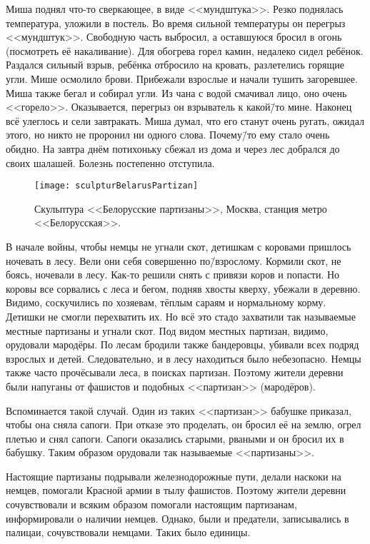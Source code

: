 Миша поднял что-то сверкающее, в виде <<мундштука>>. Резко поднялась температура, уложили в постель. Во время сильной температуры он перегрыз <<мундштук>>. Свободную часть выбросил, а оставшуюся бросил в огонь (посмотреть её накаливание). Для обогрева горел камин, недалеко сидел ребёнок. Раздался сильный взрыв, ребёнка отбросило на кровать, разлетелись горящие угли. Мише осмолило брови. Прибежали взрослые и начали тушить загоревшее. Миша также бегал и собирал угли. Из чана с водой смачивал лицо, оно очень <<горело>>. Оказывается, перегрыз он взрыватель к какой\=/то мине. Наконец всё улеглось и сели завтракать. Миша думал, что его станут очень ругать, ожидал этого, но никто не проронил ни одного слова. Почему\=/то ему стало очень обидно. На завтра днём потихоньку сбежал из дома и через лес добрался до своих шалашей. Болезнь постепенно отступила. 

\begin{wrapfigure}{O}{.4\textwidth}
\centering
\texttt{[image: sculpturBelarusPartizan]}
\caption{Скульптура <<Белорусские партизаны>>, Москва, станция метро <<Белорусская>>.}
\label{fig:sculpturBelarusPartizan}
\end{wrapfigure}

В начале войны, чтобы немцы не угнали скот, детишкам с коровами пришлось ночевать в лесу. Вели они себя совершенно по\=/взрослому. Кормили скот, не боясь, ночевали в лесу. Как-то решили снять с привязи коров и попасти. Но коровы все сорвались с леса и бегом, подняв хвосты кверху, убежали в деревню. Видимо, соскучились по хозяевам, тёплым сараям и нормальному корму. Детишки не смогли перехватить их. Но всё это стадо захватили так называемые местные партизаны и угнали скот. Под видом местных партизан, видимо, орудовали мародёры. По лесам бродили также бандеровцы, убивали всех подряд взрослых и детей. Следовательно, и в лесу находиться было небезопасно. Немцы также часто прочёсывали леса, в поисках партизан. Поэтому жители деревни были напуганы от фашистов и подобных <<партизан>> (мародёров). 

Вспоминается такой случай. Один из таких <<партизан>> бабушке приказал, чтобы она сняла сапоги. При отказе это проделать, он бросил её на землю, огрел плетью и снял сапоги. Сапоги оказались старыми, рваными и он бросил их в бабушку. Таким образом орудовали так называемые <<партизаны>>.

Настоящие партизаны подрывали железнодорожные пути, делали наскоки на немцев, помогали Красной армии в тылу фашистов. Поэтому жители деревни сочувствовали и всяким образом помогали настоящим партизанам, информировали о наличии немцев. Однако, были и предатели, записывались в палицаи, сочувствовали немцами. Таких было единицы. 


